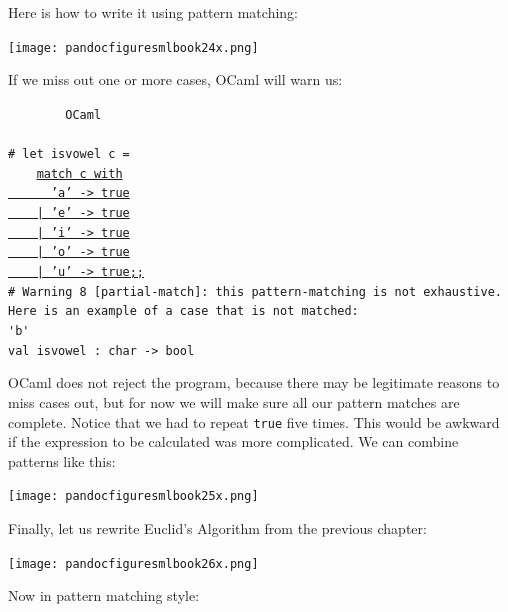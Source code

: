 \documentclass[]{book}
\newcommand{\smspace}{\vspace{4mm}}
\begin{document}
\noindent Here is how to write it using pattern matching:

\medskip
\begin{center}
\noindent\texttt{[image: pandocfiguresmlbook24x.png]}
\end{center}
\medskip

\noindent If we miss out one or more cases, OCaml will warn us:

\smspace
\noindent\verb!        OCaml!\\
\noindent\\
\noindent\verb!# let isvowel c =!\\
\noindent\mbox{\texttt{~~~~\underline{\vphantom{g}match c with}}}\\
\noindent\underline{\vphantom{g}\texttt{~~~~~~'a' -> true}}\\
\noindent\underline{\vphantom{g}\texttt{~~~~|~'e' -> true}}\\
\noindent\underline{\vphantom{g}\texttt{~~~~|~'i' -> true}}\\
\noindent\underline{\vphantom{g}\texttt{~~~~|~'o' -> true}}\\
\noindent\underline{\vphantom{g}\texttt{~~~~|~'u' -> true;;}}\\
\noindent\texttt{\# Warning 8 [partial-match]:\ this pattern-matching is not exhaustive.}\\
\noindent\verb!Here is an example of a case that is not matched:!\\
\noindent\verb!'b'!\\
\noindent\texttt{val isvowel :\ char -> bool}
\smspace

\noindent OCaml does not reject the program, because there may be legitimate reasons to miss cases out, but for now we will make sure all our pattern matches are complete. Notice that we had to repeat \texttt{true} five times. This would be awkward if the expression to be calculated was more complicated. We can combine patterns like this:

\medskip
\begin{center}
\noindent\texttt{[image: pandocfiguresmlbook25x.png]}
\end{center}
\medskip

\noindent Finally, let us rewrite Euclid's Algorithm from the previous chapter:

\medskip
\begin{center}
\noindent\texttt{[image: pandocfiguresmlbook26x.png]}
\end{center}
\medskip

\noindent Now in pattern matching style:
\end{document}
